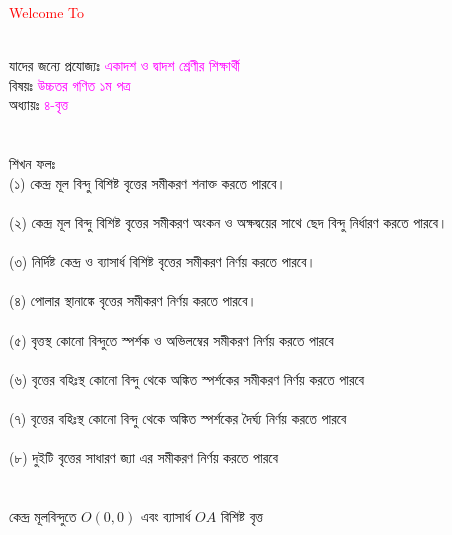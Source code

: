 \documentclass{article}
\begin{document}
 
	\Large
	\textcolor{red}{Welcome To} 
	\\
	\\
	যাদের জন্যে প্রযোজ্যঃ  	\textcolor{magenta}{একাদশ ও দ্বাদশ শ্রেণীর শিক্ষার্থী} \\
	বিষয়ঃ \textcolor{magenta}{উচ্চতর গণিত ১ম পত্র} \\
	অধ্যায়ঃ \textcolor{magenta}{৪-বৃত্ত}\\ 
	\\
	\\
শিখন ফলঃ\\
(১) কেন্দ্র মূল বিন্দু বিশিষ্ট বৃত্তের সমীকরণ শনাক্ত করতে পারবে। \\
\\
(২)  কেন্দ্র মূল বিন্দু বিশিষ্ট বৃত্তের সমীকরণ অংকন ও অক্ষদ্বয়ের সাথে ছেদ বিন্দু নির্ধারণ করতে পারবে। \\
\\
(৩) নির্দিষ্ট কেন্দ্র ও ব্যাসার্ধ বিশিষ্ট বৃত্তের  সমীকরণ নির্ণয় করতে পারবে। \\
\\
(৪) পোলার স্থানাঙ্কে বৃত্তের  সমীকরণ নির্ণয় করতে পারবে। \\
\\
(৫) বৃত্তস্থ কোনো বিন্দুতে স্পর্শক ও অভিলম্বের সমীকরণ নির্ণয় করতে পারবে\\ 
\\
(৬) বৃত্তের বহিঃস্থ কোনো বিন্দু থেকে অঙ্কিত স্পর্শকের সমীকরণ নির্ণয় করতে পারবে\\
\\
(৭) বৃত্তের বহিঃস্থ কোনো বিন্দু থেকে অঙ্কিত স্পর্শকের দৈর্ঘ্য নির্ণয় করতে পারবে\\
\\
(৮) দুইটি বৃত্তের সাধারণ জ্যা এর সমীকরণ নির্ণয় করতে পারবে\\ 
\\ 
\vspace{4cm}
	\\ 
কেন্দ্র মূলবিন্দুতে $O(0,0)$ এবং ব্যাসার্ধ $OA$ বিশিষ্ট বৃত্ত\\ 
	\\ 
\\
\end{document}

